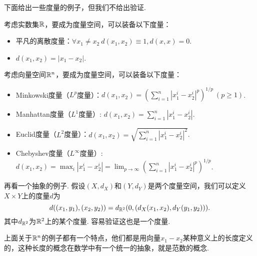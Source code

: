 下面给出一些度量的例子，但我们不给出验证. 
\begin{example}\label{ex:metric}
    考虑实数集$\mathbb{R}$，要成为度量空间，可以装备以下度量：
    \begin{itemize}
            \item 平凡的离散度量：$\forall x_1\neq x_2\ d(x_1,x_2)\equiv 1, d(x,x)=0$. 
            \item $d(x_1,x_2)=|x_1-x_2|$. 
        \end{itemize}
        考虑向量空间$\mathbb{R}^n$，要成为度量空间，可以装备以下度量：
        \begin{itemize}
            \item Minkowski度量（$L^p$度量）：$d(x_1,x_2)=(\sum_{i=1}^n|x_1^i-x_2^i|^p)^{1/p}\ (p\ge 1)$. 
            \item Manhattan度量（$L^1$度量）: $d(x_1,x_2)=\sum_{i=1}^n|x_1^i-x_2^i|$. 
            \item Euclid度量（$L^2$度量）：$d(x_1,x_2)=\sqrt{\sum_{i=1}^n|x_1^i-x_2^i|^2}$. 
            \item Chebyshev度量（$L^\infty$度量）: $d(x_1,x_2)=\max_i|x_1^i-x_2^i|=\lim_{p\to\infty}(\sum_{i=1}^n|x_1^i-x_2^i|^p)^{1/p}$. 
        \end{itemize}
    再看一个抽象的例子. 假设$(X,d_X)$和$(Y,d_Y)$是两个度量空间，我们可以定义$X\times Y$上的度量$d$为
    \[d((x_1,y_1),(x_2,y_2))=d_{\mathbb{R}^2}(0,(d_X(x_1,x_2),d_Y(y_1,y_2))).\]
    其中$d_{\mathbb{R}^2}$为$\mathbb{R}^2$上的某个度量. 容易验证这也是一个度量. 
\end{example}

上面关于$\mathbb{R}^n$的例子都有一个特点，他们都是用向量$x_1-x_2$某种意义上的长度定义的，这种长度的概念在数学中有一个统一的抽象，就是范数的概念. 

